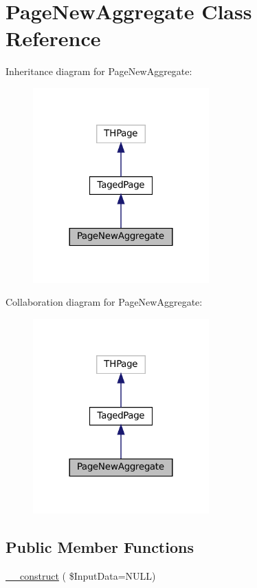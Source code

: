 \hypertarget{class_page_new_aggregate}{}\section{Page\+New\+Aggregate Class Reference}
\label{class_page_new_aggregate}


Inheritance diagram for Page\+New\+Aggregate\+:\nopagebreak
\begin{figure}[H]
\begin{center}
\leavevmode
\includegraphics[width=192pt]{class_page_new_aggregate__inherit__graph}
\end{center}
\end{figure}


Collaboration diagram for Page\+New\+Aggregate\+:\nopagebreak
\begin{figure}[H]
\begin{center}
\leavevmode
\includegraphics[width=192pt]{class_page_new_aggregate__coll__graph}
\end{center}
\end{figure}
\subsection*{Public Member Functions}
\begin{DoxyCompactItemize}
\item 
\hyperlink{class_page_new_aggregate_a393fae93301b4baecf79b221a31c4eb5}{\+\_\+\+\_\+construct} ( \$Input\+Data=N\+U\+LL)
\end{DoxyCompactItemize}
